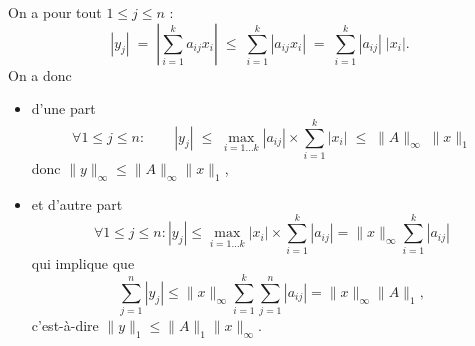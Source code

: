 \proof On a pour tout $1 \leq j \leq n$ :
$$
|y_j| 
\; = \; \left|\sum_{i=1}^k a_{ij} x_i \right| 
\; \leq \; \sum_{i=1}^k |a_{ij} x_i| 
\; = \; \sum_{i=1}^k |a_{ij}| \; |x_i|.
$$
On a donc
\begin{itemize}
  \item d'une part
  $$
  \forall 1 \leq j \leq n: \qquad |y_j| 
  \; \leq \; \max_{i=1 \dots k} |a_{ij}| \times \sum_{i=1}^k |x_i| 
  \; \leq \; \|A\|_\infty \; \|x\|_1
  $$
  donc $\|y\|_\infty \leq \|A\|_\infty \|x\|_1$,
  \item et d'autre part
  $$
  \forall 1 \leq j \leq n: |y_j| 
  \leq \max_{i=1 \dots k} |x_i| \times \sum_{i=1}^k |a_{ij}| = \|x\|_\infty \sum_{i=1}^k |a_{ij}| 
  $$
  qui implique que
  $$
  \sum_{j=1}^n |y_j| 
  \leq \|x\|_\infty \sum_{i=1}^k \sum_{j=1}^n |a_{ij}| = \|x\|_\infty \|A\|_1,
  $$
  c'est-à-dire $\|y\|_1 \leq \|A\|_1 \|x\|_\infty$.
\end{itemize}
\eproof

